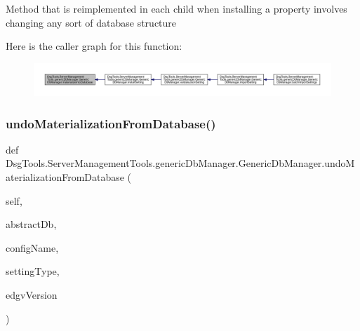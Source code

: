\begin{DoxyVerb}Method that is reimplemented in each child when installing a property involves changing any sort of database structure
\end{DoxyVerb}
 Here is the caller graph for this function\+:
\nopagebreak
\begin{figure}[H]
\begin{center}
\leavevmode
\includegraphics[width=350pt]{class_dsg_tools_1_1_server_management_tools_1_1generic_db_manager_1_1_generic_db_manager_a38ba344295e7df9c16d05ace9f2ec8f3_icgraph}
\end{center}
\end{figure}
\mbox{\label{class_dsg_tools_1_1_server_management_tools_1_1generic_db_manager_1_1_generic_db_manager_a6888cc54a692a094b7f0651939bbc852}} 
\subsubsection{\texorpdfstring{undo\+Materialization\+From\+Database()}{undoMaterializationFromDatabase()}}
{\footnotesize\ttfamily def Dsg\+Tools.\+Server\+Management\+Tools.\+generic\+Db\+Manager.\+Generic\+Db\+Manager.\+undo\+Materialization\+From\+Database (\begin{DoxyParamCaption}\item[{}]{self,  }\item[{}]{abstract\+Db,  }\item[{}]{config\+Name,  }\item[{}]{setting\+Type,  }\item[{}]{edgv\+Version }\end{DoxyParamCaption})}

